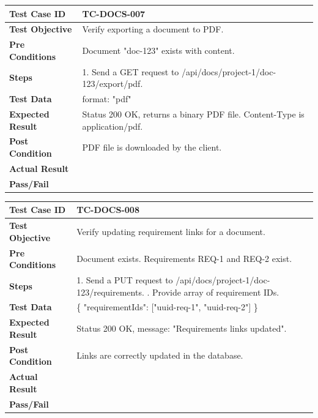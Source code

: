 \begin{longtable}{|p{}|p{}|}
\hline
\textbf{Test Case ID} & TC-DOCS-007 \\ \hline
\textbf{Test Objective} & Verify exporting a document to PDF. \\ \hline
\textbf{Pre Conditions} & Document "doc-123" exists with content. \\ \hline
\textbf{Steps} & 
1. Send a GET request to /api/docs/project-1/doc-123/export/pdf. \\ \hline
\textbf{Test Data} & format: "pdf" \\ \hline
\textbf{Expected Result} & Status 200 OK, returns a binary PDF file. Content-Type is application/pdf. \\ \hline
\textbf{Post Condition} & PDF file is downloaded by the client. \\ \hline
\textbf{Actual Result} &  \\ \hline
\textbf{Pass/Fail} &  \\ \hline
\end{longtable}

\begin{longtable}{|p{}|p{}|}
\hline
\textbf{Test Case ID} & TC-DOCS-008 \\ \hline
\textbf{Test Objective} & Verify updating requirement links for a document. \\ \hline
\textbf{Pre Conditions} & Document exists. Requirements REQ-1 and REQ-2 exist. \\ \hline
\textbf{Steps} & 
1. Send a PUT request to /api/docs/project-1/doc-123/requirements. \newline
2. Provide array of requirement IDs. \\ \hline
\textbf{Test Data} & \{ "requirementIds": ["uuid-req-1", "uuid-req-2"] \} \\ \hline
\textbf{Expected Result} & Status 200 OK, message: "Requirements links updated". \\ \hline
\textbf{Post Condition} & Links are correctly updated in the database. \\ \hline
\textbf{Actual Result} &  \\ \hline
\textbf{Pass/Fail} &  \\ \hline
\end{longtable}

